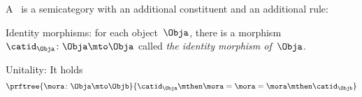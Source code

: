 %
%
\begin{ctdefinition}[Category]
    \label{def:categorymain}
    A \emph{}~\CatC is a semicategory with an additional constituent and an additional rule:
    \begin{body}
        \constit
        \begin{compactenum}
            \item Identity morphisms: for each object~$\Obja$, there is a morphism~$\catid_{\Obja}\colon \Obja \mto \Obja$  called \emph{the identity morphism of~$\Obja$}.
        \end{compactenum}
        \condit
        \begin{compactenum}
            \item Unitality: It holds
            \begin{equation}
                \prftree{\mora \colon \Obja \mto \Objb}{\catid_\Obja \mthen \mora= \mora = \mora \mthen \catid_\Objb}
            \end{equation}
        \end{compactenum}
    \end{body}
\end{ctdefinition}


